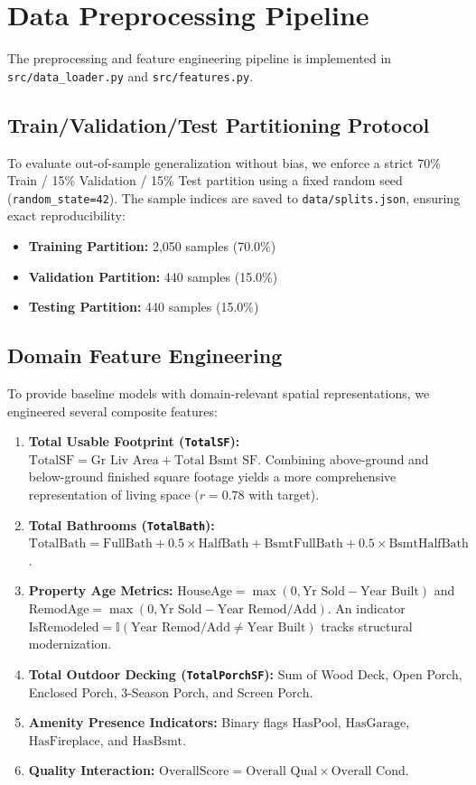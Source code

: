 \documentclass[11pt,a4paper]{article}
\begin{document}
\section{Data Preprocessing Pipeline}
The preprocessing and feature engineering pipeline is implemented in \texttt{src/data\_loader.py} and \texttt{src/features.py}.

\subsection{Train/Validation/Test Partitioning Protocol}
To evaluate out-of-sample generalization without bias, we enforce a strict 70\% Train / 15\% Validation / 15\% Test partition using a fixed random seed (\texttt{random\_state=42}). The sample indices are saved to \texttt{data/splits.json}, ensuring exact reproducibility:
\begin{itemize}
    \item \textbf{Training Partition:} 2,050 samples (70.0\%)
    \item \textbf{Validation Partition:} 440 samples (15.0\%)
    \item \textbf{Testing Partition:} 440 samples (15.0\%)
\end{itemize}

\subsection{Domain Feature Engineering}
To provide baseline models with domain-relevant spatial representations, we engineered several composite features:
\begin{enumerate}
    \item \textbf{Total Usable Footprint (\texttt{TotalSF}):} $\text{TotalSF} = \text{Gr Liv Area} + \text{Total Bsmt SF}$. Combining above-ground and below-ground finished square footage yields a more comprehensive representation of living space ($r = 0.78$ with target).
    \item \textbf{Total Bathrooms (\texttt{TotalBath}):} $\text{TotalBath} = \text{FullBath} + 0.5 \times \text{HalfBath} + \text{BsmtFullBath} + 0.5 \times \text{BsmtHalfBath}$.
    \item \textbf{Property Age Metrics:} $\text{HouseAge} = \max(0, \text{Yr Sold} - \text{Year Built})$ and $\text{RemodAge} = \max(0, \text{Yr Sold} - \text{Year Remod/Add})$. An indicator $\text{IsRemodeled} = \mathbb{I}(\text{Year Remod/Add} \neq \text{Year Built})$ tracks structural modernization.
    \item \textbf{Total Outdoor Decking (\texttt{TotalPorchSF}):} Sum of Wood Deck, Open Porch, Enclosed Porch, 3-Season Porch, and Screen Porch.
    \item \textbf{Amenity Presence Indicators:} Binary flags $\text{HasPool}$, $\text{HasGarage}$, $\text{HasFireplace}$, and $\text{HasBsmt}$.
    \item \textbf{Quality Interaction:} $\text{OverallScore} = \text{Overall Qual} \times \text{Overall Cond}$.
\end{enumerate}
\end{document}
